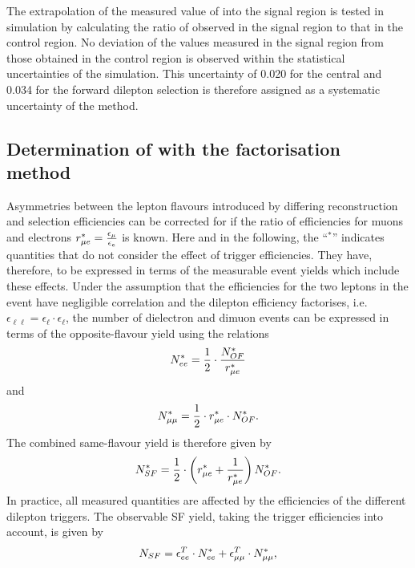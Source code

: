 The extrapolation of the measured value of \Rsfof into the signal region is tested in simulation by calculating the ratio of \Rsfof observed in the signal region to that in the control region. No deviation of the values measured in the signal region from those obtained in the control region is observed within the statistical uncertainties of the simulation. This uncertainty of 0.020 for the central and 0.034 for the forward dilepton selection is therefore assigned as a systematic uncertainty of the method. 



\subsection{Determination of \Rsfof with the factorisation method}
\label{sec:rmue}
Asymmetries between the lepton flavours introduced by differing reconstruction and selection efficiencies can be corrected for if the ratio of efficiencies for muons and electrons $r_{\mu e}^{*} = \frac{\epsilon_{\mu}}{\epsilon_{e}}$ is known. Here and in the following, the ``$^{*}$'' indicates quantities that do not consider the effect of trigger efficiencies. They have, therefore, to be expressed in terms of the measurable event yields which include these effects. Under the assumption that the efficiencies for the two leptons in the event have negligible correlation and the dilepton efficiency factorises, i.e. $\epsilon_{\ell\ell} = \epsilon_{\ell}\cdot\epsilon_{\ell}$, the number of dielectron and dimuon events can be expressed in terms of the opposite-flavour yield using the relations
\begin{equation*}
N_{ee}^{*} = \frac{1}{2}\cdot \frac{N_{OF}^{*}}{r_{\mu e}^{*}}
\end{equation*}
and 
\begin{equation*}
N_{\mu\mu}^{*} = \frac{1}{2} \cdot r_{\mu e}^{*} \cdot N_{OF}^{*}.
\end{equation*}
The combined same-flavour yield is therefore given by
\begin{equation*}
N_{SF}^{*} = \frac{1}{2}\cdot \left( r_{\mu e}^{*} + \frac{1}{r_{\mu e}^{*}} \right) N_{OF}^{*}.
\end{equation*}
In practice, all measured quantities are affected by the efficiencies of the different dilepton triggers. The observable SF yield, taking the trigger efficiencies into account, is given by
\begin{equation*}
N_{SF} = \epsilon_{ee}^T \cdot N_{ee}^{*} + \epsilon_{\mu\mu}^T \cdot N_{\mu\mu}^{*},
\end{equation*}
